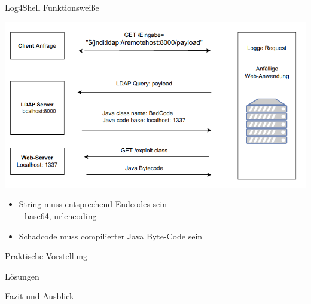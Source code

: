 \documentclass{beamer}
\begin{document}
\begin{frame}{Log4Shell Funktionsweiße}
\begin{center}
\includegraphics[scale=0.40]{log4shellschaubild.png}
\end{center}
\end{frame}
\begin{frame}
 \begin{itemize}
  \item String muss entsprechend Endcodes sein\\
  - base64, urlencoding
  \item Schadcode muss compilierter Java Byte-Code sein
 \end{itemize}

\end{frame}

\begin{frame}{Praktische Vorstellung}
 
\end{frame}
\begin{frame}{Lösungen}
 
\end{frame}
\begin{frame}{Fazit und Ausblick}
 
\end{frame}
\end{document}

